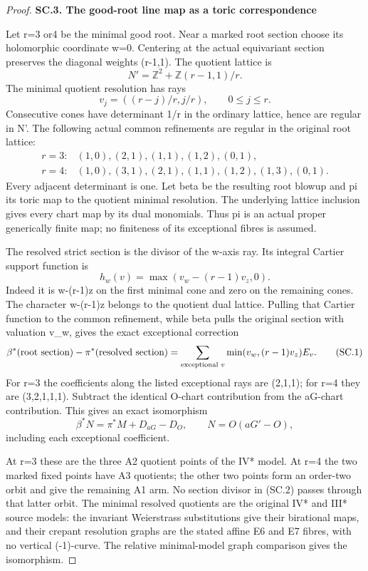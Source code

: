 \begin{proof}
\par

\medskip\noindent\textbf{SC.3. The good-root line map as a toric correspondence}

Let r=3 or4 be the minimal good root. Near a marked root section
choose its holomorphic coordinate w=0. Centering at the actual
equivariant section preserves the diagonal weights (r-1,1).
The quotient lattice is
\[
 N'=\mathbb Z^2+\mathbb Z(r-1,1)/r.
\]
The minimal quotient resolution has rays
\[
 v_j=((r-j)/r,j/r),\qquad 0\le j\le r.
\]
Consecutive cones have determinant 1/r in the ordinary lattice,
hence are regular in N'. The following actual common refinements
are regular in the original root lattice:
\[
\begin{array}{ll}
r=3:&(1,0),(2,1),(1,1),(1,2),(0,1),\\
r=4:&(1,0),(3,1),(2,1),(1,1),(1,2),(1,3),(0,1).
\end{array}
\]
Every adjacent determinant is one. Let beta be the resulting root
blowup and pi its toric map to the quotient minimal resolution.
The underlying lattice inclusion gives every chart map by its
dual monomials. Thus pi is an actual proper generically finite
map; no finiteness of its exceptional fibres is assumed.

The resolved strict section is the divisor of the w-axis ray.
Its integral Cartier support function is
\[
 h_w(v)=\max(v_w-(r-1)v_z,0).
\]
Indeed it is w-(r-1)z on the first minimal cone and zero on the
remaining cones. The character w-(r-1)z belongs to the quotient
dual lattice. Pulling that Cartier function to the common
refinement, while beta pulls the original section with valuation
v\_w, gives the exact exceptional correction
\[
 \beta^*(\hbox{root section})-\pi^*(\hbox{resolved section})
 =\sum_{\text{exceptional }v}\min(v_w,(r-1)v_z)E_v.       \tag{SC.1}
\]
For r=3 the coefficients along the listed exceptional rays are
(2,1,1); for r=4 they are (3,2,1,1,1). Subtract the identical
O-chart contribution from the aG-chart contribution. This gives
an exact isomorphism
\[
 \beta^*N=\pi^*M+D_{aG}-D_O,\qquad N=O(aG'-O),           \tag{SC.2}
\]
including each exceptional coefficient.

At r=3 these are the three A2 quotient points of the IV* model.
At r=4 the two marked fixed points have A3 quotients; the other
two points form an order-two orbit and give the remaining A1
arm. No section divisor in (SC.2) passes through that latter
orbit. The minimal resolved quotients are the original IV* and
III* source models: the invariant Weierstrass substitutions give
their birational maps, and their crepant resolution graphs are
the stated affine E6 and E7 fibres, with no vertical (-1)-curve.
The relative minimal-model graph comparison gives the isomorphism.


\end{proof}
